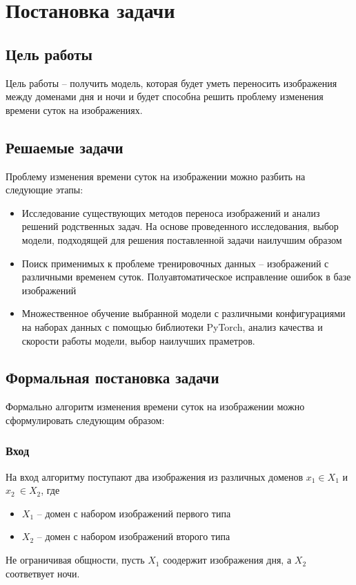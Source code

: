 \documentclass[11pt,a4paper]{extarticle}
\begin{document}
\newpage
\section{Постановка задачи}

	\subsection{Цель работы}

		Цель работы -- получить модель, которая будет уметь переносить изображения между доменами дня и ночи и будет способна решить проблему изменения времени суток на изображениях.

	\subsection{Решаемые задачи}

		Проблему изменения времени суток на изображении можно разбить на следующие этапы:
		\newline
		\begin{itemize}
			\vspace{-1em}
			\item Исследование существующих методов переноса изображений и анализ решений родственных задач. На основе проведенного исследования, выбор модели, подходящей для решения поставленной задачи наилучшим образом
			\item Поиск применимых к проблеме тренировочных данных -- изображений с различными временем суток. Полуавтоматическое исправление ошибок в базе изображений
			\item Множественное обучение выбранной модели с различными конфигурациями на наборах данных с помощью библиотеки PyTorch, анализ качества и скорости работы модели, выбор наилучших праметров.
		\end{itemize}

	\subsection{Формальная постановка задачи}\label{intro_problem}

		Формально алгоритм изменения времени суток на изображении можно сформулировать следующим образом:
		\vspace{-1em}
		\subsubsection*{Вход}
			На вход алгоритму поступают два изображения из различных доменов \(x_{1} \in X_{1}\)  и \(x_{2}\ \in X_{2}\), где
			\begin{itemize}
				\item \(X_{1}\) -- домен с набором изображений первого типа
				\item \(X_{2}\) -- домен с набором изображений второго типа
			\end{itemize}
			Не ограничивая общности, пусть \(X_{1}\) соодержит изображения дня, а \(X_{2}\) соответвует ночи.
		\vspace{-1em}
\end{document}
